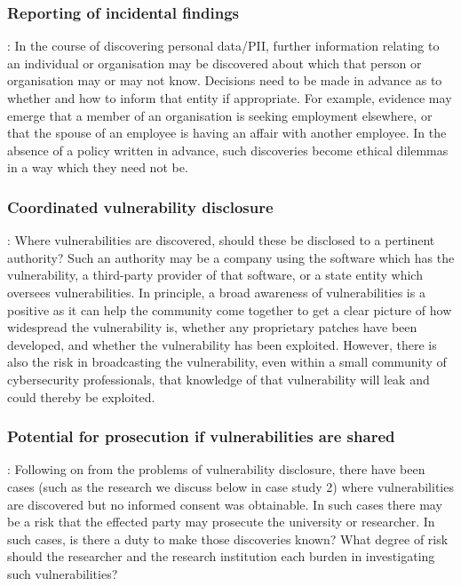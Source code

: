 \documentclass{svjour3}                     %
\begin{document}
\begin{itemize}
\subsubsection{Reporting of incidental findings}:
In the course of discovering personal data/PII, further information relating to an individual or organisation may be discovered about which that person or organisation may or may not know.  Decisions need to be made in advance as to whether and how to inform that entity if appropriate. For example, evidence may emerge that a member of an organisation is seeking employment elsewhere, or that the spouse of an employee is having an affair with another employee. In the absence of a policy written in advance, such discoveries become ethical dilemmas in a way which they need not be.

\subsubsection{Coordinated vulnerability disclosure}:
Where vulnerabilities are discovered, should these be disclosed to a pertinent authority? Such an authority may be a company using the software which has the vulnerability, a third-party provider of that software, or a state entity which oversees vulnerabilities. In principle, a broad awareness of vulnerabilities is a positive as it can help the community come together to get a clear picture of how widespread the vulnerability is, whether any proprietary patches have been developed, and whether the vulnerability has been exploited. However, there is also the risk in broadcasting the vulnerability, even within a small community of cybersecurity professionals, that knowledge of that vulnerability will leak and could thereby be exploited.

\subsubsection{Potential for prosecution if vulnerabilities are shared}:
Following on from the problems of vulnerability disclosure, there have been cases (such as the research we discuss below in case study 2) where vulnerabilities are discovered but no informed consent was obtainable. In such cases there may be a risk that the effected party may prosecute the university or researcher. In such cases, is there a duty to make those discoveries known? What degree of risk should the researcher and the research institution each burden in investigating such vulnerabilities?


\end{itemize}
\end{document}
